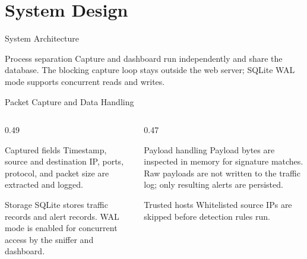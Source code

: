 \documentclass{SKP-beamer}
\begin{document}
\section{System Design}
\begin{frame}{System Architecture}
\centering
{}
\vspace{0.5cm}
\begin{block}{Process separation}
Capture and dashboard run independently and share the database. The blocking capture loop stays outside the web server; SQLite WAL mode supports concurrent reads and writes.
\end{block}
\end{frame}

\begin{frame}{Packet Capture and Data Handling}
\begin{columns}[T]
\begin{column}{0.49\textwidth}
\begin{block}{Captured fields}
Timestamp, source and destination IP, ports, protocol, and packet size are extracted and logged.
\end{block}
\begin{block}{Storage}
SQLite stores traffic records and alert records. WAL mode is enabled for concurrent access by the sniffer and dashboard.
\end{block}
\end{column}
\begin{column}{0.47\textwidth}
\begin{alertblock}{Payload handling}
Payload bytes are inspected in memory for signature matches. Raw payloads are not written to the traffic log; only resulting alerts are persisted.
\end{alertblock}
\begin{exampleblock}{Trusted hosts}
Whitelisted source IPs are skipped before detection rules run.
\end{exampleblock}
\end{column}
\end{columns}
\end{frame}
\end{document}
